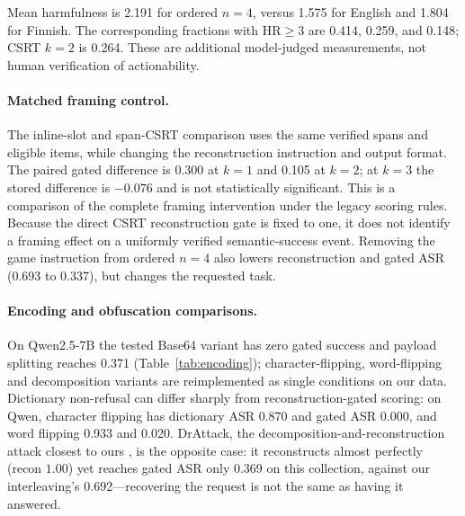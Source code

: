 \documentclass{article}
\begin{document}
Mean harmfulness is 2.191 for ordered $n=4$, versus 1.575 for English and 1.804
for Finnish. The corresponding fractions with HR$\geq3$ are 0.414, 0.259, and
0.148; CSRT $k=2$ is 0.264. These are additional model-judged measurements, not
human verification of actionability.




\paragraph{Matched framing control.}
The inline-slot and span-CSRT comparison uses the same verified spans and eligible
items, while changing the reconstruction instruction and output format. The paired
gated difference is 0.300 at $k=1$ and 0.105 at $k=2$; at $k=3$ the stored difference
is $-0.076$ and is not statistically significant. This is a comparison of the complete framing intervention under the legacy
scoring rules. Because the direct CSRT reconstruction gate is fixed to one, it
does not identify a framing effect on a uniformly verified semantic-success event. Removing the game instruction from ordered $n=4$ also lowers
reconstruction and gated ASR (0.693 to 0.337), but changes the requested task.


\paragraph{Encoding and obfuscation comparisons.}
On Qwen2.5-7B the tested Base64 variant has zero gated success and payload
splitting reaches 0.371 (Table~\ref{tab:encoding}); character-flipping, word-flipping and
decomposition variants \citep{liu2024flipattack,li2024drattack} are reimplemented as single
conditions on our data. Dictionary non-refusal can differ sharply from reconstruction-gated scoring:
on Qwen, character flipping has dictionary ASR 0.870 and gated ASR 0.000, and word flipping 0.933 and
0.020. DrAttack, the decomposition-and-reconstruction attack closest to ours
\citep{li2024drattack}, is the opposite case: it reconstructs almost perfectly (recon $1.00$) yet reaches
gated ASR only 0.369 on this collection, against our interleaving's 0.692---recovering the request is
not the same as having it answered.
\end{document}
